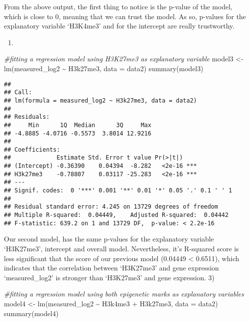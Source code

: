\documentclass[
]{article}
\newenvironment{Shaded}{\begin{snugshade}}{\end{snugshade}}
\newcommand{\AttributeTok}[1]{\textcolor[rgb]{0.77,0.63,0.00}{#1}}
\newcommand{\CommentTok}[1]{\textcolor[rgb]{0.56,0.35,0.01}{\textit{#1}}}
\newcommand{\FunctionTok}[1]{\textcolor[rgb]{0.00,0.00,0.00}{#1}}
\newcommand{\NormalTok}[1]{#1}
\newcommand{\OtherTok}[1]{\textcolor[rgb]{0.56,0.35,0.01}{#1}}
\newcommand{\SpecialCharTok}[1]{\textcolor[rgb]{0.00,0.00,0.00}{#1}}
\providecommand{\tightlist}{%
  \setlength{\itemsep}{0pt}\setlength{\parskip}{0pt}}
\begin{document}
From the above output, the first thing to notice is the p-value of the
model, which is close to 0, meaning that we can trust the model. As so,
p-values for the explanatory variable `H3K4me3' and for the intercept
are really trustworthy.

\begin{enumerate}
\def\labelenumi{\arabic{enumi})}
\setcounter{enumi}{1}
\tightlist
\item
\end{enumerate}

\begin{Shaded}
\begin{Highlighting}[]
\CommentTok{\#fitting a regression model using H3K27me3 as explanatory variable}
\NormalTok{model3 }\OtherTok{\textless{}{-}} \FunctionTok{lm}\NormalTok{(measured\_log2 }\SpecialCharTok{\textasciitilde{}}\NormalTok{ H3k27me3, }\AttributeTok{data =}\NormalTok{ data2)}
\FunctionTok{summary}\NormalTok{(model3)}
\end{Highlighting}
\end{Shaded}

\begin{verbatim}
## 
## Call:
## lm(formula = measured_log2 ~ H3k27me3, data = data2)
## 
## Residuals:
##     Min      1Q  Median      3Q     Max 
## -4.8885 -4.0716 -0.5573  3.8014 12.9216 
## 
## Coefficients:
##             Estimate Std. Error t value Pr(>|t|)    
## (Intercept) -0.36390    0.04394  -8.282   <2e-16 ***
## H3k27me3    -0.78807    0.03117 -25.283   <2e-16 ***
## ---
## Signif. codes:  0 '***' 0.001 '**' 0.01 '*' 0.05 '.' 0.1 ' ' 1
## 
## Residual standard error: 4.245 on 13729 degrees of freedom
## Multiple R-squared:  0.04449,    Adjusted R-squared:  0.04442 
## F-statistic: 639.2 on 1 and 13729 DF,  p-value: < 2.2e-16
\end{verbatim}

Our second model, has the same p-values for the explanatory variable
`H3K27me3', intercept and overall model. Nevertheless, it's R-squared
score is less significant that the score of our previous model (0.04449
\textless{} 0.6511), which indicates that the correlation between
`H3K27me3' and gene expression `measured\_log2' is stronger than
`H3K27me3' and gene expression. 3)

\begin{Shaded}
\begin{Highlighting}[]
\CommentTok{\#fitting a regression model using both epigenetic marks as explanatory variables}
\NormalTok{model4 }\OtherTok{\textless{}{-}} \FunctionTok{lm}\NormalTok{(measured\_log2 }\SpecialCharTok{\textasciitilde{}}\NormalTok{ H3k4me3 }\SpecialCharTok{+}\NormalTok{ H3k27me3, }\AttributeTok{data =}\NormalTok{ data2)}
\FunctionTok{summary}\NormalTok{(model4)}
\end{Highlighting}
\end{Shaded}
\end{document}
